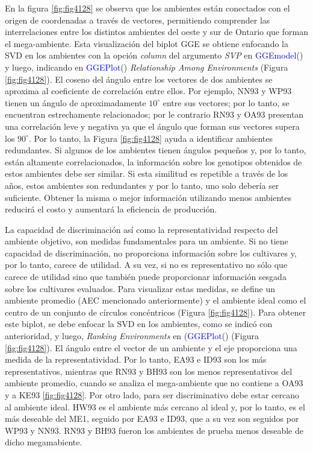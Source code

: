 En la figura \ref{fig:fig4128} se observa que los ambientes están conectados con el origen de coordenadas a través de vectores, permitiendo comprender las interrelaciones entre los distintos ambientes del oeste y sur de Ontario que forman el mega-ambiente.  Esta visualización del biplot GGE se obtiene enfocando la SVD en los ambientes con la opción \emph{column} del argumento \emph{SVP} en \textcolor{blue}{GGEmodel}() y luego, indicando en \textcolor{blue}{GGEPlot}() \emph{Relationship Among Environments} (Figura \ref{fig:fig4128}). El coseno del ángulo entre los vectores de dos ambientes se aproxima al coeficiente de correlación entre ellos. Por ejemplo, NN93 y WP93 tienen un ángulo de aproximadamente $10^{\circ}$ entre sus vectores; por lo tanto, se encuentran estrechamente relacionados; por le contrario RN93 y OA93 presentan una correlación leve y negativa ya que el ángulo que forman sus vectores supera los $90^{\circ}$.  Por lo tanto, la Figura \ref{fig:fig4128} ayuda a identificar ambientes redundantes. Si algunos de los ambientes tienen ángulos pequeños y, por lo tanto, están altamente correlacionados, la información sobre los genotipos obtenidos de estos ambientes debe ser similar. Si esta similitud es repetible a través de los años, estos ambientes son redundantes y por lo tanto, uno solo debería ser suficiente. Obtener la misma o mejor información utilizando menos ambientes reducirá el costo y aumentará la eficiencia de producción.


La capacidad de discriminación así como la representatividad respecto del ambiente objetivo, son medidas fundamentales para un ambiente. Si no tiene capacidad de discriminación, no proporciona información sobre los cultivares y, por lo tanto, carece de utilidad. A su vez, si no es representativo no sólo que carece de utilidad sino que también puede proporcionar información sesgada sobre los cultivares evaluados. Para visualizar estas medidas, se define un ambiente promedio (AEC mencionado anteriormente) y el ambiente ideal como el centro de un conjunto de círculos concéntricos (Figura \ref{fig:fig4128}). Para obtener este biplot, se debe enfocar la SVD en los ambientes, como se indicó con anterioridad, y luego, \emph{Ranking Environments} en (\textcolor{blue}{GGEPlot}() (Figura \ref{fig:fig4128}). El ángulo entre el vector de un ambiente y el eje proporciona una medida de la representatividad. Por lo tanto, EA93 e ID93 son los más representativos, mientras que RN93 y BH93 son los menos representativos del ambiente promedio, cuando se analiza el mega-ambiente que no contiene a OA93 y a KE93 \ref{fig:fig4128}. Por otro lado, para ser discriminativo debe estar cercano al ambiente ideal. HW93 es el ambiente más cercano al ideal y, por lo tanto, es el más deseable del ME1, seguido por EA93 e ID93, que a su vez son seguidos por WP93 y NN93. RN93 y BH93 fueron los ambientes de prueba menos deseable de dicho megamabiente.




